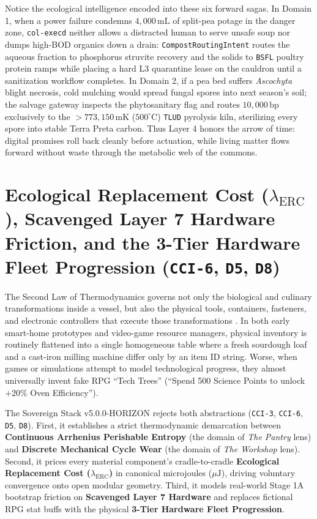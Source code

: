 Notice the ecological intelligence encoded into these six forward sagas. In Domain 1, when a
power failure condemns $4{,}000\,\mathrm{mL}$ of split-pea potage in the danger zone,
\texttt{col-execd} neither allows a distracted human to serve unsafe soup nor dumps high-BOD
organics down a drain: \texttt{CompostRoutingIntent} routes the aqueous fraction to phosphorus
struvite recovery and the solids to \texttt{BSFL} poultry protein ramps while placing a hard L3
quarantine lease on the cauldron until a sanitization workflow completes. In Domain 2, if a
pea bed suffers \emph{Ascochyta} blight necrosis, cold mulching would spread fungal spores into
next season's soil; the salvage gateway inspects the phytosanitary flag and routes $10{,}000\,\mathrm{bp}$
exclusively to the $> 773{,}150\,\mathrm{mK}$ ($500^\circ\mathrm{C}$) \texttt{TLUD} pyrolysis
kiln, sterilizing every spore into stable Terra Preta carbon. Thus Layer 4 honors the arrow of
time: digital promises roll back cleanly before actuation, while living matter flows forward
without waste through the metabolic web of the commons.

\section{Ecological Replacement Cost ($\lambda_{\mathrm{ERC}}$), Scavenged Layer 7 Hardware Friction, and the 3-Tier Hardware Fleet Progression (\texttt{CCI-6}, \texttt{D5}, \texttt{D8})}
\label{sec:erc-scavenged-l7-fleet-progression}

The Second Law of Thermodynamics governs not only the biological and culinary transformations inside a vessel, but also the physical tools, containers, fasteners, and electronic controllers that execute those transformations \parencite{georgescu1971,odum1971}. In both early smart-home prototypes and video-game resource managers, physical inventory is routinely flattened into a single homogeneous table where a fresh sourdough loaf and a cast-iron milling machine differ only by an item ID string. Worse, when games or simulations attempt to model technological progress, they almost universally invent fake RPG ``Tech Trees'' (``Spend 500 Science Points to unlock $+20\%$ Oven Efficiency'').

The Sovereign Stack v5.0.0-HORIZON rejects both abstractions (\texttt{CCI-3}, \texttt{CCI-6}, \texttt{D5}, \texttt{D8}). First, it establishes a strict thermodynamic demarcation between \textbf{Continuous Arrhenius Perishable Entropy} (the domain of \emph{The Pantry} lens) and \textbf{Discrete Mechanical Cycle Wear} (the domain of \emph{The Workshop} lens). Second, it prices every material component's cradle-to-cradle \textbf{Ecological Replacement Cost ($\lambda_{\mathrm{ERC}}$)} in canonical microjoules ($\mu\mathrm{J}$), driving voluntary convergence onto open modular geometry. Third, it models real-world Stage 1A bootstrap friction on \textbf{Scavenged Layer 7 Hardware} and replaces fictional RPG stat buffs with the physical \textbf{3-Tier Hardware Fleet Progression}.

